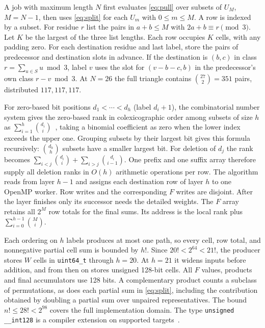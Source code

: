 \documentclass[11pt]{article}
\begin{document}
A job with maximum length \(N\) first evaluates \eqref{eq:pull} over
subsets of \(U_M\), \(M=N-1\), then uses \eqref{eq:split} for each
\(U_m\) with \(0\le m\le M\). A row is indexed by a subset.
For residue \(r\) list the pairs in \(a+b\le M\) with
\(2a+b\equiv r\pmod3\). Let \(K\) be the largest of the three list
lengths. Each row occupies \(K\) cells, with any padding zero. For each
destination residue and last label, store the pairs of predecessor and
destination slots in advance. If the destination is \((b,c)\) in
class \(r=\sum_{u\in S}u\bmod3\), label \(v\) uses the slot for
\((v-b-c,b)\) in the predecessor's own class \(r-v\bmod3\). At \(N=26\) the full triangle contains
\(\binom{27}{2}=351\) pairs, distributed \(117,117,117\).

For zero-based bit positions \(d_1<\cdots<d_h\) (label \(d_i+1\)),
the combinatorial number system gives the zero-based rank in
colexicographic order among subsets of size \(h\) as
\(\sum_{i=1}^h\binom{d_i}{i}\)~\cite{colex}, taking a binomial coefficient
as zero when the lower index exceeds the upper one. Grouping subsets by
their largest bit gives this formula recursively: \(\binom{d_h}{h}\)
subsets have a smaller largest bit. For deletion of \(d_j\) the rank becomes
\(\sum_{i<j}\binom{d_i}{i}+\sum_{i>j}\binom{d_i}{i-1}\).
One prefix and one suffix array therefore supply all deletion ranks in
\(O(h)\) arithmetic operations per row. The algorithm reads from layer
\(h-1\) and assigns each destination row of layer \(h\) to one OpenMP
worker. Row writes and the corresponding \(F\) writes are disjoint.
After the layer finishes only its successor needs the detailed weights.
The \(F\) array retains all \(2^M\) row totals for the final sums.
Its address is the local rank plus \(\sum_{i=0}^{h-1}\binom{M}{i}\).

Each ordering on \(h\) labels produces at most one path, so every cell,
row total, and nonnegative partial cell sum is bounded by \(h!\).
Since \(20!<2^{64}<21!\), the producer stores \(W\) cells in
\texttt{uint64\_t} through \(h=20\). At \(h=21\) it widens inputs
before addition, and from then on stores unsigned 128-bit cells.
All \(F\) values, products and final accumulators use 128 bits.
A complementary product counts a subclass of permutations, as does
each partial sum in \eqref{eq:split}, including the contribution obtained
by doubling a partial sum over unpaired representatives. The bound
\(n!\le28!<2^{98}\) covers the full implementation domain.
The type \texttt{unsigned \_\_int128} is a compiler extension on supported
targets~\cite{gcc}.
\end{document}
